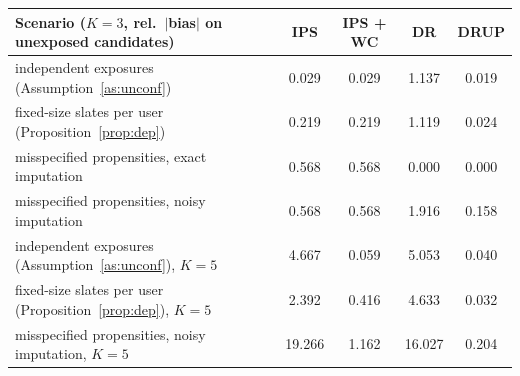 \begin{tabular}{lcccc}
\toprule
Scenario ($K=3$, rel.\ $|$bias$|$ on unexposed candidates) & IPS & IPS + WC & DR & DRUP\\
\midrule
independent exposures (Assumption~\ref{as:unconf}) & 0.029 & 0.029 & 1.137 & 0.019\\
fixed-size slates per user (Proposition~\ref{prop:dep}) & 0.219 & 0.219 & 1.119 & 0.024\\
misspecified propensities, exact imputation & 0.568 & 0.568 & 0.000 & 0.000\\
misspecified propensities, noisy imputation & 0.568 & 0.568 & 1.916 & 0.158\\
independent exposures (Assumption~\ref{as:unconf}), $K=5$ & 4.667 & 0.059 & 5.053 & 0.040\\
fixed-size slates per user (Proposition~\ref{prop:dep}), $K=5$ & 2.392 & 0.416 & 4.633 & 0.032\\
misspecified propensities, noisy imputation, $K=5$ & 19.266 & 1.162 & 16.027 & 0.204\\
\bottomrule
\end{tabular}
